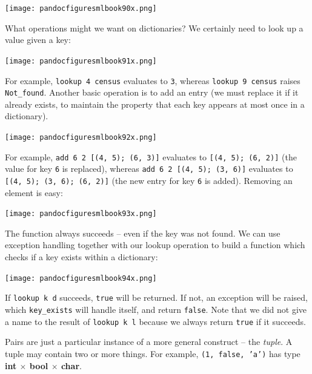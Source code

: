 \documentclass[]{book}
\begin{document}
\medskip
\begin{center}
\noindent\texttt{[image: pandocfiguresmlbook90x.png]}
\end{center}
\medskip

\noindent What operations might we want on dictionaries? We certainly need to look up a value given a key:

\medskip
\begin{center}
\noindent\texttt{[image: pandocfiguresmlbook91x.png]}
\end{center}
\medskip

\noindent For example, \texttt{lookup 4 census} evaluates to \texttt{3}, whereas \texttt{lookup 9 census} raises \texttt{Not\_found}. Another basic operation is to add an entry (we must replace it if it already exists, to maintain the property that each key appears at most once in a dictionary).

\medskip
\begin{center}
\noindent\texttt{[image: pandocfiguresmlbook92x.png]}
\end{center}
\medskip

\noindent For example, \texttt{add 6 2 [(4, 5); (6, 3)]} evaluates to \texttt{[(4, 5); (6, 2)]} (the value for key \texttt{6} is replaced), whereas \texttt{add 6 2 [(4, 5); (3, 6)]} evaluates to \texttt{[(4, 5); (3, 6); (6, 2)]} (the new entry for key \texttt{6} is added). Removing an element is easy:

\medskip
\begin{center}
\noindent\texttt{[image: pandocfiguresmlbook93x.png]}
\end{center}
\medskip

\noindent The function always succeeds -- even if the key was not found. We can use exception handling together with our lookup operation to build a function which checks if a key exists within a dictionary:

\medskip
\begin{center}
\noindent\texttt{[image: pandocfiguresmlbook94x.png]}
\end{center}
\medskip

\noindent If \texttt{lookup k d} succeeds, \texttt{true} will be returned. If not, an exception will be raised, which \texttt{key\_exists} will handle itself, and return \texttt{false}. Note that we did not give a name to the result of \texttt{lookup k l} because we always return \texttt{true} if it succeeds.

Pairs are just a particular instance of a more general construct -- the \textit{tuple}. A tuple may contain two or more things. For example, \texttt{(1, false, 'a')} has type \textsf{\textbf{int $\times$ bool $\times$ char}}. 
\end{document}
